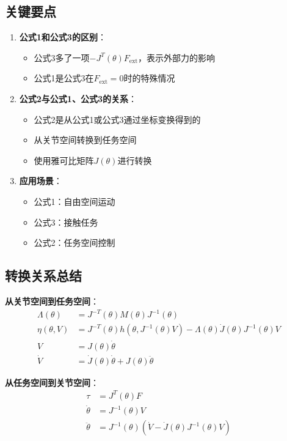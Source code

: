 \documentclass[12pt,a4paper]{article}
\begin{document}
\subsection{关键要点}

\begin{enumerate}
\item \textbf{公式1和公式3的区别}：
\begin{itemize}
\item 公式3多了一项$-J^T(\theta)F_{\text{ext}}$，表示外部力的影响
\item 公式1是公式3在$F_{\text{ext}} = 0$时的特殊情况
\end{itemize}

\item \textbf{公式2与公式1、公式3的关系}：
\begin{itemize}
\item 公式2是从公式1或公式3通过坐标变换得到的
\item 从关节空间转换到任务空间
\item 使用雅可比矩阵$J(\theta)$进行转换
\end{itemize}

\item \textbf{应用场景}：
\begin{itemize}
\item 公式1：自由空间运动
\item 公式3：接触任务
\item 公式2：任务空间控制
\end{itemize}
\end{enumerate}

\subsection{转换关系总结}

\textbf{从关节空间到任务空间}：
\begin{align}
\Lambda(\theta) &= J^{-T}(\theta)M(\theta)J^{-1}(\theta) \\
\eta(\theta, V) &= J^{-T}(\theta)h(\theta, J^{-1}(\theta)V) - \Lambda(\theta)\dot{J}(\theta)J^{-1}(\theta)V \\
V &= J(\theta)\dot{\theta} \\
\dot{V} &= \dot{J}(\theta)\dot{\theta} + J(\theta)\ddot{\theta}
\end{align}

\textbf{从任务空间到关节空间}：
\begin{align}
\tau &= J^T(\theta)F \\
\dot{\theta} &= J^{-1}(\theta)V \\
\ddot{\theta} &= J^{-1}(\theta)(\dot{V} - \dot{J}(\theta)J^{-1}(\theta)V)
\end{align}
\end{document}
